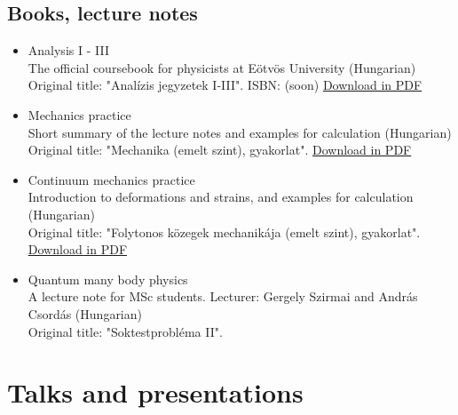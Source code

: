 \documentclass[11pt,a4paper,sans]{moderncv}        %
\begin{document}
\subsection{Books, lecture notes}
\begin{itemize}
\item Analysis I - III\\The official coursebook for physicists at Eötvös University (Hungarian)
\\Original title: "Analízis jegyzetek I-III". ISBN: (soon) \href{http://web.cs.elte.hu/~tarcsay/analizis-jegyzetek.pdf}{Download in PDF}

\item Mechanics practice\\
Short summary of the lecture notes and examples for calculation (Hungarian)\\
Original title: "Mechanika (emelt szint), gyakorlat". \href{https://metalog.elte.hu/nextcloud/index.php/s/AKqe8ZxjCswPrJE}{Download in PDF}

\item Continuum mechanics practice\\
Introduction to deformations and strains, and examples for calculation (Hungarian)\\
Original title: "Folytonos közegek mechanikája (emelt szint), gyakorlat". \href{https://metalog.elte.hu/nextcloud/index.php/s/QcPbMpB6cR6MsNE}{Download in PDF}

\item Quantum many body physics\\
A lecture note for MSc students. Lecturer: Gergely Szirmai and András Csordás (Hungarian)\\
Original title: "Soktestprobléma II".
\end{itemize}

\section{Talks and presentations}

\end{document}

